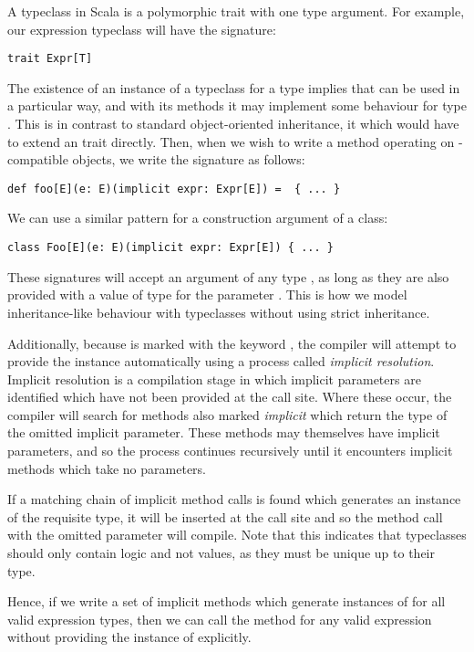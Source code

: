 A typeclass in Scala is a polymorphic trait with one type argument. For example, our expression typeclass will have the signature:
\vs \begin{lstlisting}
trait Expr[T]
\end{lstlisting} \vs
The existence of an instance of a typeclass for a type  implies that  can be used in a particular way, and with its methods it may implement some behaviour for type . This is in contrast to standard object-oriented inheritance, it which  would have to extend an  trait directly. Then, when we wish to write a method operating on -compatible objects, we write the signature as follows:
\vs \begin{lstlisting}
def foo[E](e: E)(implicit expr: Expr[E]) =  { ... }
\end{lstlisting} \vs
We can use a similar pattern for a construction argument of a class:
\vs \begin{lstlisting}
class Foo[E](e: E)(implicit expr: Expr[E]) { ... }
\end{lstlisting} \vs

These signatures will accept an argument of any type , as long as they are also provided with a value of type  for the parameter . This is how we model inheritance-like behaviour with typeclasses without using strict inheritance.

Additionally, because  is marked with the keyword , the compiler will attempt to provide the instance automatically using a process called \textit{implicit resolution}. Implicit resolution is a compilation stage in which implicit parameters are identified which have not been provided at the call site. Where these occur, the compiler will search for methods also marked \textit{implicit} which return the type of the omitted implicit parameter. These methods may themselves have implicit parameters, and so the process continues recursively until it encounters implicit methods which take no parameters.

If a matching chain of implicit method calls is found which generates an instance of the requisite type, it will be inserted at the call site and so the method call with the omitted parameter will compile. Note that this indicates that typeclasses should only contain logic and not values, as they must be unique up to their type.

Hence, if we write a set of implicit methods which generate instances of  for all valid expression types, then we can call the method  for any valid expression without providing the instance of  explicitly.

